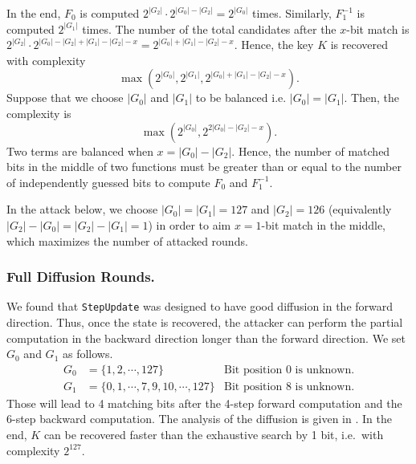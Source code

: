 In the end,
$F_0$ is computed $2^{|G_2|} \cdot 2^{|G_0|-|G_2|} = 2^{|G_0|}$ times.
Similarly, $F_1^{-1}$ is computed $2^{|G_1|}$ times. The number of the total candidates after the $x$-bit match is $2^{|G_2|} \cdot 2^{|G_0|-|G_2| + |G_1|-|G_2| - x} = 2^{|G_0| + |G_1| - |G_2| - x}$. Hence, the key $K$ is recovered with complexity $$\max( 2^{|G_0|}, 2^{|G_1|}, 2^{|G_0| + |G_1| - |G_2| - x}).$$
Suppose that we choose $|G_0|$ and $|G_1|$ to be balanced i.e. $|G_0|=|G_1|$. Then, the complexity is $$\max( 2^{|G_0|}, 2^{2|G_0| - |G_2| - x}).$$
Two terms are balanced when $x = |G_0| - |G_2|$. Hence, the number of matched bits in the middle of two functions must be greater than or equal to the number of independently guessed bits to compute $F_0$ and $F_1^{-1}$.

In the attack below, we choose $|G_0|=|G_1|=127$ and $|G_2|=126$ (equivalently $|G_2|-|G_0| = |G_2|-|G_1| = 1$) in order to aim $x=1$-bit match in the middle, which maximizes the number of attacked rounds.

\subsubsection{Full Diffusion Rounds.}
We found that {\tt StepUpdate} was designed to have good diffusion in the forward direction. Thus, once the state is recovered, the attacker can perform the partial computation in the backward direction longer than the forward direction. We set $G_0$ and $G_1$ as follows.
\begin{align*}
G_0 &= \{1, 2, \cdots, 127\} & \textrm {Bit position 0 is unknown.}\\
G_1 &= \{0, 1, \cdots, 7, 9, 10, \cdots, 127\} & \textrm {Bit position 8 is unknown.}
\end{align*}
Those will lead to 4 matching bits after the 4-step forward computation and the 6-step backward computation. The analysis of the diffusion is given in . In the end, $K$ can be recovered faster than the exhaustive search by 1 bit, i.e.~with complexity $2^{127}$.

